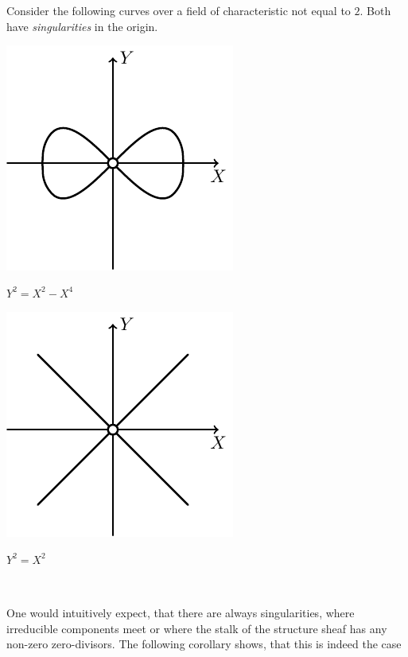 \documentclass[a4paper,parskip=half,numbers=enddot, DIV=12]{scrreprt}
\begin{document}
\begin{example*}%
    Consider the following curves over a field of characteristic not equal to $2$. Both have \emph{singularities} in the origin.
     \begin{center}
    	\begin{minipage}{0.42\textwidth}
    		\centering
    		\includegraphics{Curve3.pdf}
    		
    		$Y^2=X^2-X^4$
    	\end{minipage}
    	\begin{minipage}{0.42\textwidth}
    		\centering
    		\includegraphics{Curve4.pdf}
    		
    		$Y^2=X^2$
    	\end{minipage}\\    	
    	\phantom{we need more space}
    \end{center}    
\end{example*}
One would intuitively expect, that there are always singularities, where irreducible components meet or where the stalk of the structure sheaf has any non-zero zero-divisors. The following corollary shows, that this is indeed the case
\end{document}
